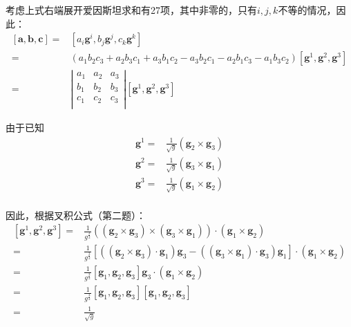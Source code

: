 \documentclass[UTF8,zihao=5]{ctexart}
\newcommand{\bm}[1]{{\mathbf{#1}}}
\begin{document}
考虑上式右端展开爱因斯坦求和有27项，其中非零的，只有$i,j,k$不等的情况，因此：
\begin{equation*}
    \begin{aligned}
        [\bm{a},\bm{b},\bm{c}]
        =&[a_i\bm{g}^i,b_j\bm{g}^j,c_k\bm{g}^k]\\
        =&(
            a_1b_2c_3 + a_2b_3c_1 + a_3b_1c_2
            -a_3b_2c_1 - a_2b_1c_3 - a_1b_3c_2
        )
        [\bm{g}^1, \bm{g}^2, \bm{g}^3]\\
        =&\left|
            \begin{matrix}
                a_1 &a_2 &a_3\\
                b_1 &b_2 &b_3\\
                c_1 &c_2 &c_3\\
            \end{matrix}
        \right|[\bm{g}^1, \bm{g}^2, \bm{g}^3]
    \end{aligned}
\end{equation*}

由于已知
\begin{equation*}
    \begin{aligned}
        \bm{g}^1=&
        \frac{1}{\sqrt{g}}(\bm{g}_2\times\bm{g}_3)\\
        \bm{g}^2=&
        \frac{1}{\sqrt{g}}(\bm{g}_3\times\bm{g}_1)\\
        \bm{g}^3=&
        \frac{1}{\sqrt{g}}(\bm{g}_1\times\bm{g}_2)\\
    \end{aligned}
\end{equation*}

因此，根据叉积公式（第二题）：
\begin{equation*}
    \begin{aligned}
        [\bm{g}^1, \bm{g}^2, \bm{g}^3]=&
        \frac{1}{g^{\frac{3}{2}}}
        \left(
            (\bm{g}_2\times\bm{g}_3)\times
            (\bm{g}_3\times\bm{g}_1)
        \right)\cdot
        (\bm{g}_1\times\bm{g}_2)\\
        =&
        \frac{1}{g^{\frac{3}{2}}}
        \left[
            \left(
                (\bm{g}_2\times\bm{g}_3)\cdot\bm{g}_1
            \right)\bm{g}_3-
            \left(
                (\bm{g}_3\times\bm{g}_1)\cdot\bm{g}_3
            \right)\bm{g}_1
        \right]\cdot
        (\bm{g}_1\times\bm{g}_2)\\
        =&
        \frac{1}{g^{\frac{3}{2}}}
            [\bm{g}_1,\bm{g}_2,\bm{g}_3]\bm{g}_3\cdot
        (\bm{g}_1\times\bm{g}_2)\\
        =&
        \frac{1}{g^{\frac{3}{2}}}
            [\bm{g}_1,\bm{g}_2,\bm{g}_3][\bm{g}_1,\bm{g}_2,\bm{g}_3]\\
        =&
        \frac{1}{\sqrt{g}}
    \end{aligned}
\end{equation*}
\end{document}
